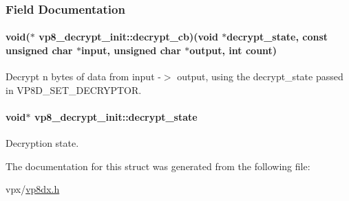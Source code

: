 \subsubsection{\-Field \-Documentation}
\hypertarget{structvp8__decrypt__init_ae8eaa106b6567813006a0afb5a46a36c}{
\paragraph[{decrypt\-\_\-cb}]{\setlength{\rightskip}{0pt plus 5cm}void($\ast$ {\bf vp8\-\_\-decrypt\-\_\-init\-::decrypt\-\_\-cb})(void $\ast${\bf decrypt\-\_\-state}, const unsigned char $\ast$input, unsigned char $\ast$output, int count)}}\label{structvp8__decrypt__init_ae8eaa106b6567813006a0afb5a46a36c}
\-Decrypt n bytes of data from input -\/$>$ output, using the decrypt\-\_\-state passed in \-V\-P8\-D\-\_\-\-S\-E\-T\-\_\-\-D\-E\-C\-R\-Y\-P\-T\-O\-R. \hypertarget{structvp8__decrypt__init_a1bb41a1fbd95eaccc79a322dc4c6685d}{
\paragraph[{decrypt\-\_\-state}]{\setlength{\rightskip}{0pt plus 5cm}void$\ast$ {\bf vp8\-\_\-decrypt\-\_\-init\-::decrypt\-\_\-state}}}\label{structvp8__decrypt__init_a1bb41a1fbd95eaccc79a322dc4c6685d}
\-Decryption state. 

\-The documentation for this struct was generated from the following file\-:\begin{DoxyCompactItemize}
\item 
vpx/\hyperlink{vp8dx_8h}{vp8dx.\-h}\end{DoxyCompactItemize}
